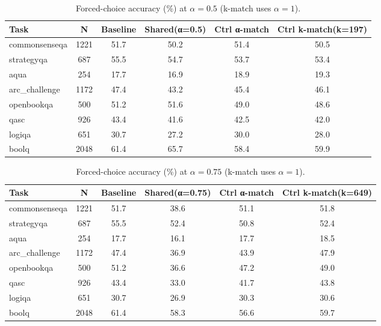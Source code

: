 \begin{table}[t]
\centering
\caption{Forced-choice accuracy (\%) at $\alpha=0.5$ (k-match uses $\alpha=1$).}
\label{tab:energy_kmatch_alpha_0_5}
\begin{tabular}{lccccc}
\hline
Task & N & Baseline & Shared(α=0.5) & Ctrl α-match & Ctrl k-match(k=197) \\
\hline
commonsenseqa & 1221 & 51.7 & 50.2 & 51.4 & 50.5 \\
strategyqa & 687 & 55.5 & 54.7 & 53.7 & 53.4 \\
aqua & 254 & 17.7 & 16.9 & 18.9 & 19.3 \\
arc\_challenge & 1172 & 47.4 & 43.2 & 45.4 & 46.1 \\
openbookqa & 500 & 51.2 & 51.6 & 49.0 & 48.6 \\
qasc & 926 & 43.4 & 41.6 & 42.5 & 42.0 \\
logiqa & 651 & 30.7 & 27.2 & 30.0 & 28.0 \\
boolq & 2048 & 61.4 & 65.7 & 58.4 & 59.9 \\
\hline
\end{tabular}
\end{table}

\begin{table}[t]
\centering
\caption{Forced-choice accuracy (\%) at $\alpha=0.75$ (k-match uses $\alpha=1$).}
\label{tab:energy_kmatch_alpha_0_75}
\begin{tabular}{lccccc}
\hline
Task & N & Baseline & Shared(α=0.75) & Ctrl α-match & Ctrl k-match(k=649) \\
\hline
commonsenseqa & 1221 & 51.7 & 38.6 & 51.1 & 51.8 \\
strategyqa & 687 & 55.5 & 52.4 & 50.8 & 52.4 \\
aqua & 254 & 17.7 & 16.1 & 17.7 & 18.5 \\
arc\_challenge & 1172 & 47.4 & 36.9 & 43.9 & 47.9 \\
openbookqa & 500 & 51.2 & 36.6 & 47.2 & 49.0 \\
qasc & 926 & 43.4 & 33.0 & 41.7 & 43.8 \\
logiqa & 651 & 30.7 & 26.9 & 30.3 & 30.6 \\
boolq & 2048 & 61.4 & 58.3 & 56.6 & 59.7 \\
\hline
\end{tabular}
\end{table}


